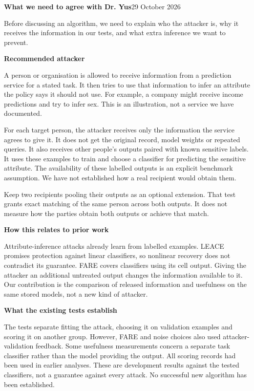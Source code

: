 \documentclass[10pt]{article}
\begin{document}
{\Large\bfseries What we need to agree with Dr. Yus}\hfill 29 October 2026
\par
Before discussing an algorithm, we need to explain who the attacker is, why it receives the information in our tests, and what extra inference we want to prevent.

\textbf{Recommended attacker}\par
A person or organisation is allowed to receive information from a prediction service for a stated task. It then tries to use that information to infer an attribute the policy says it should not use. For example, a company might receive income predictions and try to infer sex. This is an illustration, not a service we have documented.

For each target person, the attacker receives only the information the service agrees to give it. It does not get the original record, model weights or repeated queries. It also receives other people’s outputs paired with known sensitive labels. It uses these examples to train and choose a classifier for predicting the sensitive attribute. The availability of these labelled outputs is an explicit benchmark assumption. We have not established how a real recipient would obtain them.

Keep two recipients pooling their outputs as an optional extension. That test grants exact matching of the same person across both outputs. It does not measure how the parties obtain both outputs or achieve that match.

\textbf{How this relates to prior work}\par
Attribute-inference attacks already learn from labelled examples. LEACE promises protection against linear classifiers, so nonlinear recovery does not contradict its guarantee. FARE covers classifiers using its cell output. Giving the attacker an additional untreated output changes the information available to it. Our contribution is the comparison of released information and usefulness on the same stored models, not a new kind of attacker.

\textbf{What the existing tests establish}\par
The tests separate fitting the attack, choosing it on validation examples and scoring it on another group. However, FARE and noise choices also used attacker-validation feedback. Some usefulness measurements concern a separate task classifier rather than the model providing the output. All scoring records had been used in earlier analyses. These are development results against the tested classifiers, not a guarantee against every attack. No successful new algorithm has been established.
\end{document}
